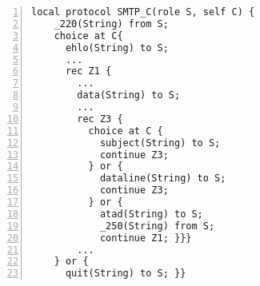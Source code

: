 \begin{lstlisting}[numbers=left]
  local protocol SMTP_C(role S, self C) {
    _220(String) from S;
    choice at C{
      ehlo(String) to S;
      ...
      rec Z1 {
        ...
        data(String) to S;
        ...
        rec Z3 {
          choice at C {
            subject(String) to S;
            continue Z3;
          } or {
            dataline(String) to S;
            continue Z3;
          } or {
            atad(String) to S;
            _250(String) from S;
            continue Z1; }}}
        ...
    } or {
      quit(String) to S; }}
\end{lstlisting}
%